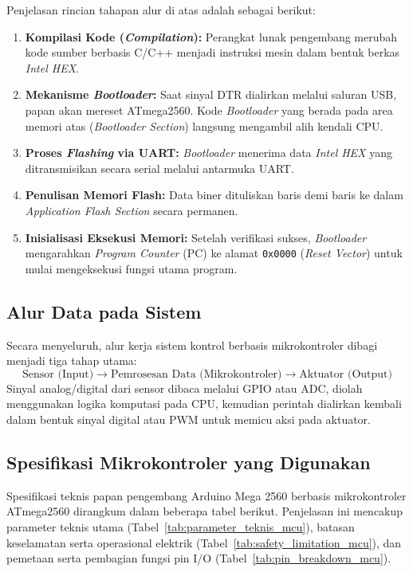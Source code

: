 Penjelasan rincian tahapan alur di atas adalah sebagai berikut:
\begin{enumerate}
	\item \textbf{Kompilasi Kode (\textit{Compilation}):} Perangkat lunak pengembang merubah kode sumber berbasis C/C++ menjadi instruksi mesin dalam bentuk berkas \textit{Intel HEX}.
	\item \textbf{Mekanisme \textit{Bootloader}:} Saat sinyal DTR dialirkan melalui saluran USB, papan akan mereset ATmega2560. Kode \textit{Bootloader} yang berada pada area memori atas (\textit{Bootloader Section}) langsung mengambil alih kendali CPU.
	\item \textbf{Proses \textit{Flashing} via UART:} \textit{Bootloader} menerima data \textit{Intel HEX} yang ditransmisikan secara serial melalui antarmuka UART.
	\item \textbf{Penulisan Memori Flash:} Data biner dituliskan baris demi baris ke dalam \textit{Application Flash Section} secara permanen.
	\item \textbf{Inisialisasi Eksekusi Memori:} Setelah verifikasi sukses, \textit{Bootloader} mengarahkan \textit{Program Counter} (PC) ke alamat \texttt{0x0000} (\textit{Reset Vector}) untuk mulai mengeksekusi fungsi utama program.
\end{enumerate}

\subsection{Alur Data pada Sistem}
Secara menyeluruh, alur kerja sistem kontrol berbasis mikrokontroler dibagi menjadi tiga tahap utama:
\[
	\text{Sensor (Input)} \longrightarrow \text{Pemrosesan Data (Mikrokontroler)} \longrightarrow \text{Aktuator (Output)}
\]
Sinyal analog/digital dari sensor dibaca melalui GPIO atau ADC, diolah menggunakan logika komputasi pada CPU, kemudian perintah dialirkan kembali dalam bentuk sinyal digital atau PWM untuk memicu aksi pada aktuator.


\subsection{Spesifikasi Mikrokontroler yang Digunakan}
Spesifikasi teknis papan pengembang Arduino Mega 2560 berbasis mikrokontroler ATmega2560 dirangkum dalam beberapa tabel berikut. Penjelasan ini mencakup parameter teknis utama (Tabel~\ref{tab:parameter_teknis_mcu}), batasan keselamatan serta operasional elektrik (Tabel~\ref{tab:safety_limitation_mcu}), dan pemetaan serta pembagian fungsi pin I/O (Tabel~\ref{tab:pin_breakdown_mcu}).

